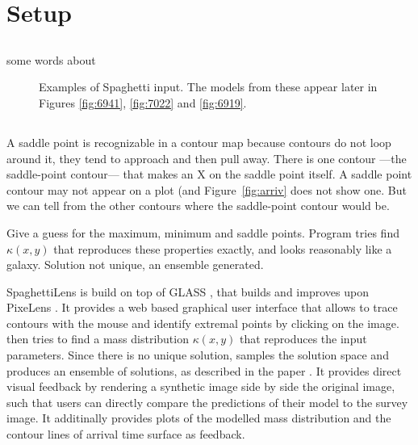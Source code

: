 \section {Setup} \label{sec:setup}

\subsection{\sw} \label{sec:SpaceWarps}
some words about \sw


\begin{figure}
  \centering
  \caption{Examples of Spaghetti input.  The models from these appear
    later in Figures \ref{fig:6941}, \ref{fig:7022} and \ref{fig:6919}.
  \label{fig:input-spag}}
\end{figure}

\subsection{\spl} \label{sec:SpaghettiLens}



A saddle point is recognizable in a contour map because contours do
not loop around it, they tend to approach and then pull away.  There
is one contour ---the saddle-point contour--- that makes an X on the
saddle point itself.  A saddle point contour may not appear on a plot
(and Figure~\ref{fig:arriv} does not show one.  But we can tell from
the other contours where the saddle-point contour would be.



Give a guess for the maximum, minimum and saddle points.  Program
tries find $\kappa(x,y)$ that reproduces these properties exactly, and
looks reasonably like a galaxy.  Solution not unique, an ensemble
generated.

\hr

SpaghettiLens is build on top of GLASS \citep{Lubini2012}, that builds and improves upon PixeLens \citep{Saha2004}.
It provides a web based graphical user interface that allows to trace contours with the mouse and identify extremal points by clicking on the image.
\spl then tries to find a mass distribution $\kappa(x,y)$ that reproduces the input parameters.
Since there is no unique solution, \spl samples the solution space and produces an ensemble of solutions, as described in the paper \citep{Lubini2012}.
It provides direct visual feedback by rendering a synthetic image side by side the original image, such that users can directly compare the predictions of their model to the survey image.
It additinally provides plots of the modelled mass distribution and the contour lines of arrival time surface as feedback. 

